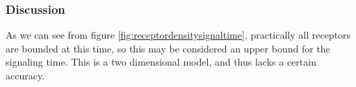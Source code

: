 \subsubsection{Discussion}
As we can see from figure \ref{fig:receptordensitysignaltime}, practically all receptors are bounded at this time, so this may be considered an upper bound for the signaling time. This is a two dimensional model, and thus lacks a certain accuracy. %